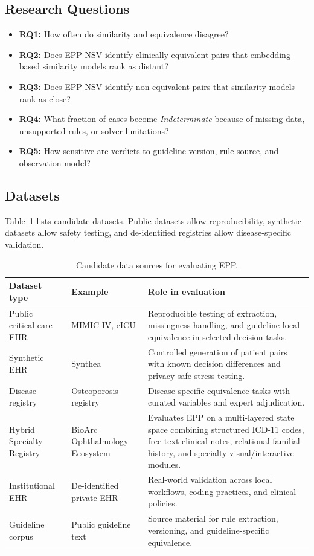 \documentclass[english,5p,twocolumn,preprint]{elsarticle}
\begin{document}
\subsection{Research Questions}
\begin{itemize}[leftmargin=*]
    \item \textbf{RQ1:} How often do similarity and equivalence disagree?
    \item \textbf{RQ2:} Does EPP-NSV identify clinically equivalent pairs that embedding-based similarity models rank as distant?
    \item \textbf{RQ3:} Does EPP-NSV identify non-equivalent pairs that similarity models rank as close?
    \item \textbf{RQ4:} What fraction of cases become \emph{Indeterminate} because of missing data, unsupported rules, or solver limitations?
    \item \textbf{RQ5:} How sensitive are verdicts to guideline version, rule source, and observation model?
\end{itemize}

\subsection{Datasets}
Table~\ref{tab:datasets} lists candidate datasets. Public datasets allow reproducibility, synthetic datasets allow safety testing, and de-identified registries allow disease-specific validation.

\begin{table}[ht!]
\centering
\caption{Candidate data sources for evaluating EPP.}
\label{tab:datasets}
\begin{tabularx}{\textwidth}{p{}p{}X}
\toprule
\textbf{Dataset type} & \textbf{Example} & \textbf{Role in evaluation} \\
\midrule
Public critical-care EHR & MIMIC-IV, eICU & Reproducible testing of extraction, missingness handling, and guideline-local equivalence in selected decision tasks. \\
Synthetic EHR & Synthea & Controlled generation of patient pairs with known decision differences and privacy-safe stress testing. \\
Disease registry & Osteoporosis registry & Disease-specific equivalence tasks with curated variables and expert adjudication. \\
Hybrid Specialty Registry & BioArc Ophthalmology Ecosystem & Evaluates EPP on a multi-layered state space combining structured ICD-11 codes, free-text clinical notes, relational familial history, and specialty visual/interactive modules. \\
Institutional EHR & De-identified private EHR & Real-world validation across local workflows, coding practices, and clinical policies. \\
Guideline corpus & Public guideline text & Source material for rule extraction, versioning, and guideline-specific equivalence. \\
\bottomrule
\end{tabularx}
\end{table}
\end{document}

